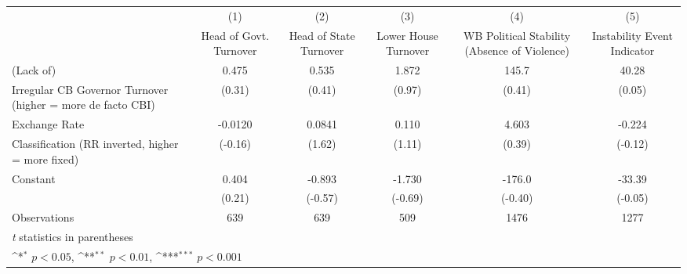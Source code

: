 {
\def\sym#1{\ifmmode^{#1}\else\(^{#1}\)\fi}
\begin{tabular}{l*{5}{c}}
\toprule
                &\multicolumn{1}{c}{(1)}&\multicolumn{1}{c}{(2)}&\multicolumn{1}{c}{(3)}&\multicolumn{1}{c}{(4)}&\multicolumn{1}{c}{(5)}\\
                &\multicolumn{1}{c}{Head of Govt. Turnover}&\multicolumn{1}{c}{Head of State Turnover}&\multicolumn{1}{c}{Lower House Turnover}&\multicolumn{1}{c}{WB Political Stability (Absence of Violence)}&\multicolumn{1}{c}{Instability Event Indicator}\\
\midrule
(Lack of)       &    0.475         &    0.535         &    1.872         &    145.7         &    40.28         \\
Irregular CB Governor Turnover (higher = more de facto CBI)&   (0.31)         &   (0.41)         &   (0.97)         &   (0.41)         &   (0.05)         \\
\addlinespace
Exchange Rate   &  -0.0120         &   0.0841         &    0.110         &    4.603         &   -0.224         \\
Classification (RR inverted, higher = more fixed)&  (-0.16)         &   (1.62)         &   (1.11)         &   (0.39)         &  (-0.12)         \\
\addlinespace
Constant        &    0.404         &   -0.893         &   -1.730         &   -176.0         &   -33.39         \\
                &   (0.21)         &  (-0.57)         &  (-0.69)         &  (-0.40)         &  (-0.05)         \\
\midrule
Observations    &      639         &      639         &      509         &     1476         &     1277         \\
\bottomrule
\multicolumn{6}{l}{\footnotesize \textit{t} statistics in parentheses}\\
\multicolumn{6}{l}{\footnotesize \sym{*} \(p<0.05\), \sym{**} \(p<0.01\), \sym{***} \(p<0.001\)}\\
\end{tabular}
}
